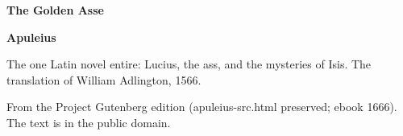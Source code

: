 \documentclass[11pt,letterpaper]{article}
\begin{document}
\color{ink}

\begin{titlepage}
\centering
\vspace*{4em}
{\LARGE\bfseries\color{heading} The Golden Asse\par}
\vspace{2em}
{\Large\bfseries\color{heading} Apuleius\par}
\vspace{2.5em}
{\itshape\color{subhead}\parbox{0.8\linewidth}{\centering The one Latin novel entire: Lucius, the ass, and the mysteries of Isis. The translation of William Adlington, 1566.\par}}
\vfill
{\small From the Project Gutenberg edition (apuleius-src.html preserved; ebook 1666). The text is in the public domain.\par}
\vspace{2em}
\end{titlepage}

\tableofcontents


\end{document}
